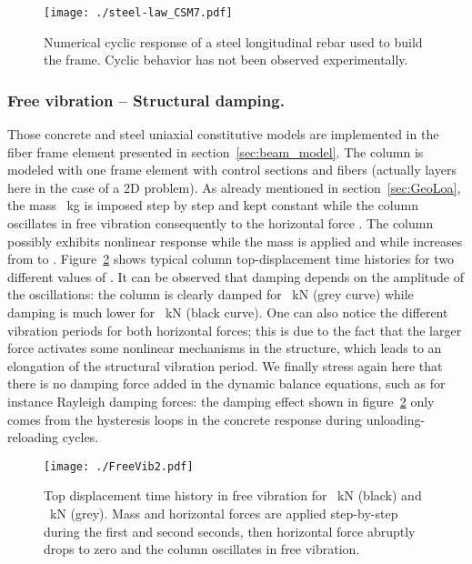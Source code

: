 \documentclass[12p]{amsart}
\begin{document}
\begin{figure}[htb]
\begin{center}
\texttt{[image: ./steel-law\_CSM7.pdf]}
\caption{Numerical cyclic response of a steel longitudinal rebar used to build the frame. Cyclic behavior has not been observed experimentally.}
\label{fig:LamontagneSteel}
\end{center}
\end{figure}


\subsubsection{Free vibration -- Structural damping.}

Those concrete and steel uniaxial constitutive models are implemented in the fiber frame element presented in section~\ref{sec:beam_model}. The column is modeled with one frame element with  control sections and  fibers (actually layers here in the case of a 2D problem). As already mentioned in section~\ref{sec:GeoLoa}, the mass ~kg is imposed step by step and kept constant while the column oscillates in free vibration consequently to the horizontal force . The column possibly exhibits nonlinear response while the mass  is applied and while  increases from  to . Figure~\ref{fig:FV-dis} shows typical column top-displacement time histories for two different values of . It can be observed that damping depends on the amplitude of the oscillations: the column is clearly damped for ~kN (grey curve) while damping is much lower for ~kN (black curve). One can also notice the different vibration periods for both horizontal forces; this is due to the fact that the larger force activates some nonlinear mechanisms in the structure, which leads to an elongation of the structural vibration period. We finally stress again here that there is no damping force added in the dynamic balance equations, such as for instance Rayleigh damping forces: the damping effect shown in figure~\ref{fig:FV-dis} only comes from the hysteresis loops in the concrete response  during unloading-reloading cycles.

\begin{figure}[htb]
\begin{center}
\texttt{[image: ./FreeVib2.pdf]}
\caption{Top displacement time history in free vibration for ~kN (black) and ~kN (grey). Mass  and horizontal forces  are applied step-by-step during the first and second seconds, then horizontal force  abruptly drops to zero and the column oscillates in free vibration.}
\label{fig:FV-dis}
\end{center}
\end{figure}
\end{document}

